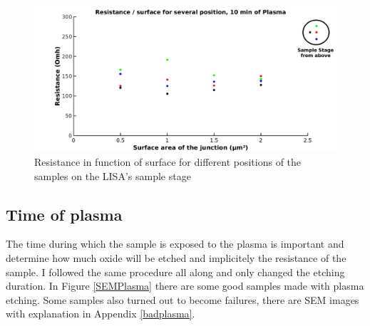                 \begin{figure}
                    \centering
                    \includegraphics[width=12cm]{R_Position.png}
                    \caption{Resistance in function of surface for different positions of the samples on the LISA's sample stage}
                    \label{PlasmaPosition}
                \end{figure}               
                
                
                \subsection{Time of plasma}
                
                The time during which the sample is exposed to the plasma is important and determine how much oxide will be etched and implicitely the resistance of the sample. I followed the same procedure all along and only changed the etching duration.
                In Figure \ref{SEMPlasma} there are some good samples made with plasma etching. Some samples also turned out to become failures, there are SEM images with explanation in Appendix \ref{badplasma}.
                 
